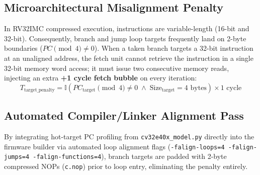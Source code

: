 \documentclass[11pt,a4paper]{article}
\begin{document}
\subsection{Microarchitectural Misalignment Penalty}
In RV32IMC compressed execution, instructions are variable-length (16-bit and 32-bit). Consequently, branch and jump loop targets frequently land on 2-byte boundaries ($PC \pmod 4 \ne 0$). When a taken branch targets a 32-bit instruction at an unaligned address, the fetch unit cannot retrieve the instruction in a single 32-bit memory word access; it must issue two consecutive memory reads, injecting an extra \textbf{+1 cycle fetch bubble} on every iteration:
\begin{equation}
    T_{\text{target\_penalty}} = \mathbb{I}(PC_{\text{target}} \pmod 4 \ne 0 \;\land\; \text{Size}_{\text{target}} = 4\text{ bytes}) \times 1\text{ cycle}
\end{equation}

\subsection{Automated Compiler/Linker Alignment Pass}
By integrating hot-target PC profiling from \texttt{cv32e40x\_model.py} directly into the firmware builder via automated loop alignment flags (\texttt{-falign-loops=4 -falign-jumps=4 -falign-functions=4}), branch targets are padded with 2-byte compressed NOPs (\texttt{c.nop}) prior to loop entry, eliminating the penalty entirely.
\end{document}
